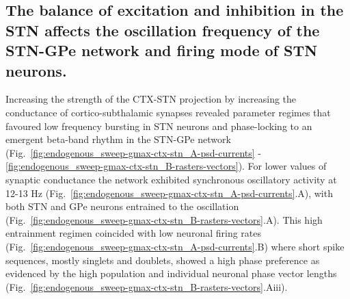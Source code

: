 %
%
%
%
%

%
%
\subsection{The balance of excitation and inhibition in the STN affects the oscillation frequency of the STN-GPe network and firing mode of STN neurons.}
\label{sec:endogenous_sweep-gmax-ctx-stn}
%
%
%
%
%
%
%
%
%
%

Increasing the strength of the CTX-STN projection by increasing the conductance of cortico-subthalamic synapses revealed parameter regimes that favoured low frequency bursting in STN neurons and phase-locking to an emergent beta-band rhythm in the STN-GPe network (Fig.~\ref{fig:endogenous_sweep-gmax-ctx-stn_A-psd-currents} - \ref{fig:endogenous_sweep-gmax-ctx-stn_B-rasters-vectors}).
For lower values of synaptic conductance the network exhibited synchronous oscillatory activity at 12-13 Hz (Fig.~\ref{fig:endogenous_sweep-gmax-ctx-stn_A-psd-currents}.A), with both STN and GPe neurons entrained to the oscillation (Fig.~\ref{fig:endogenous_sweep-gmax-ctx-stn_B-rasters-vectors}.A).
This high entrainment regimen coincided with low neuronal firing rates (Fig.~\ref{fig:endogenous_sweep-gmax-ctx-stn_A-psd-currents}.B) where short spike sequences, mostly singlets and doublets, showed a high phase preference as evidenced by the high population and individual neuronal phase vector lengths (Fig.~\ref{fig:endogenous_sweep-gmax-ctx-stn_B-rasters-vectors}.Aiii).

